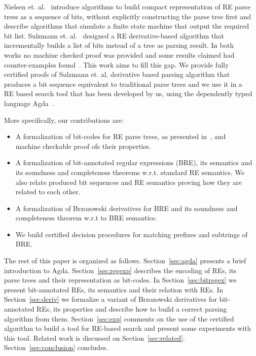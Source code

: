\documentclass[sigplan, anonymous, review]{acmart}
\theoremstyle{definition}
\begin{document}
Nielsen et. al.~\cite{Nielsen2011} introduce algorithms to build compact representation of
RE parse trees as a sequence of bits, without explicitly constructing the parse tree first
and describe algorithms that simulate a finite state machine that output the required bit list. 
Sulzmann et. al.~\cite{SulzmannL14} designed a RE derivative-based algorithm
that incrementally builds a list of bits instead of a tree as parsing result. In both works
no machine checked proof was provided and some results claimed had counter-examples
found~\cite{AusafDU16}. This work aims to fill this gap. We provide fully 
certified proofs of Sulzmann et. al. derivative based parsing algorithm that 
produces a bit sequence equivalent to traditional parse trees and we use it 
in a RE based search tool that has been developed by us, using the dependently typed language
Agda~\cite{Norell2009}.

More specifically, our contributions are:
\begin{itemize}
  \item A formalization of bit-codes for RE parse trees, as presented in~\cite{Nielsen2011},
        and machine checkable proof ofs their properties.
  \item A formalization of bit-annotated regular expressions (BRE), its semantics 
        and its soundness and completeness theorems w.r.t. standard RE semantics. 
        We also relate produced bit sequences and RE semantics proving how they 
        are related to each other.
  \item A formalization of Brzozowski derivatives for BRE and its soundness and
        completeness theorem w.r.t to BRE semantics.
  \item We build certified decision procedures for matching prefixes and subtrings
        of BRE.
\end{itemize}

The rest of this paper is organized as follows. Section~\ref{sec:agda}
presents a brief introduction to Agda. Section~\ref{sec:regexp}
describes the encoding of REs, its parse trees and their representation as 
bit-codes. In Section~\ref{sec:bitregex} we present bit-annotated REs, 
its semantics and their relation with REs. In Section~\ref{sec:deriv} 
we formalize a variant of Brzozowski derivatives for bit-annotated REs, its 
properties and describe how to build a correct parsing algorithm from them. 
Section~\ref{sec:exp} comments on the use of the certified algorithm to build a tool for
RE-based search and present some experiments with this tool. Related
work is discussed on Section~\ref{sec:related}. Section~\ref{sec:conclusion} concludes.
\end{document}
